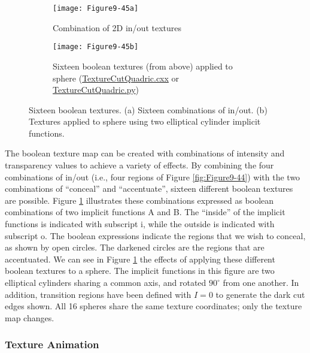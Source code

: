 \begin{figure}[htb]
	\begin{subfigure}[h]{0.58\linewidth}
		\texttt{[image: Figure9-45a]}
		\captionsetup{justification=centering}
		\caption{Combination of 2D in/out textures}
		\label{fig:Figure9-45a}
	\end{subfigure}
	\hfill
	\begin{subfigure}[h]{0.58\linewidth}
		\texttt{[image: Figure9-45b]}
		\captionsetup{justification=centering}
		\caption{Sixteen boolean textures (from above) applied to sphere  (\href{https://lorensen.github.io/VTKExamples/site/Cxx/Texture/TextureCutQuadric/}{TextureCutQuadric.cxx} or \href{https://lorensen.github.io/VTKExamples/site/Python/Texture/TextureCutQuadric/}{TextureCutQuadric.py})}
		\label{fig:Figure9-45b}
	\end{subfigure}
	\caption{Sixteen boolean textures. (a) Sixteen combinations of in/out. (b) Textures applied to sphere using two elliptical cylinder implicit functions.}\label{fig:Figure9-45}
\end{figure}

The boolean texture map can be created with combinations of intensity and transparency values to achieve a variety of effects. By combining the four combinations of in/out (i.e., four regions of Figure \ref{fig:Figure9-44}) with the two combinations of ``conceal'' and ``accentuate'', sixteen different boolean textures are possible. Figure \ref{fig:Figure9-45a} illustrates these combinations expressed as boolean combinations of two implicit functions A and B. The ``inside'' of the implicit functions is indicated with subscript i, while the outside is indicated with subscript o. The boolean expressions indicate the regions that we wish to conceal, as shown by open circles. The darkened circles are the regions that are accentuated. We can see in Figure \ref{fig:Figure9-45a} the effects of applying these different boolean textures to a sphere. The implicit functions in this figure are two elliptical cylinders sharing a common axis, and rotated $90^\circ$ from one another. In addition, transition regions have been defined with $I = 0$ to generate the dark cut edges shown. All 16 spheres share the same texture coordinates; only the texture map changes.

\subsubsection{Texture Animation}


